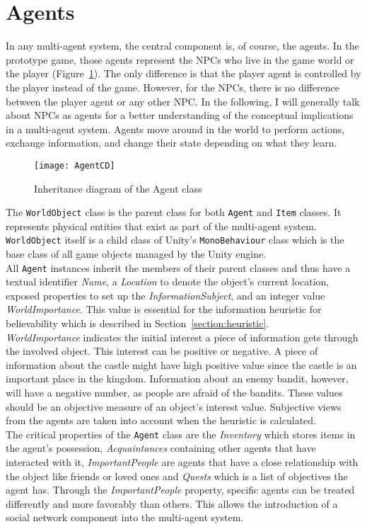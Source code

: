 \section{Agents}
In any multi-agent system, the central component is, of course, the agents. In the prototype game, those agents represent the NPCs who live in the game world or the player (Figure~\ref{fig:agentCD}). The only difference is that the player agent is controlled by the player instead of the game. However, for the NPCs, there is no difference between the player agent or any other NPC. In the following, I will generally talk about NPCs as agents for a better understanding of the conceptual implications in a multi-agent system. Agents move around in the world to perform actions, exchange information, and change their state depending on what they learn.
\begin{figure}
	\centering
	\texttt{[image: AgentCD]}
	\caption{Inheritance diagram of the Agent class}
	\label{fig:agentCD}
\end{figure}
The \verb|WorldObject| class is the parent class for both \verb|Agent| and \verb|Item| classes. It represents physical entities that exist as part of the multi-agent system. \verb|WorldObject| itself is a child class of Unity's \verb|MonoBehaviour| class which is the base class of all game objects managed by the Unity engine.\\
All \verb|Agent| instances inherit the members of their parent classes and thus have a textual identifier \textit{Name}, a \textit{Location} to denote the object's current location, exposed properties to set up the \textit{InformationSubject}, and an integer value \textit{WorldImportance}. This value is essential for the information heuristic for believability which is described in Section~\ref{section:heuristic}.\\
\textit{WorldImportance} indicates the initial interest a piece of information gets through the involved object. This interest can be positive or negative. A piece of information about the castle might have high positive value since the castle is an important place in the kingdom. Information about an enemy bandit, however, will have a negative number, as people are afraid of the bandits. These values should be an objective measure of an object's interest value. Subjective views from the agents are taken into account when the heuristic is calculated.\\
The critical properties of the \verb|Agent| class are the \textit{Inventory} which stores items in the agent's possession, \textit{Acquaintances} containing other agents that have interacted with it, \textit{ImportantPeople} are agents that have a close relationship with the object like friends or loved ones and \textit{Quests} which is a list of objectives the agent has. Through the \textit{ImportantPeople} property, specific agents can be treated differently and more favorably than others. This allows the introduction of a social network component into the multi-agent system.\\
